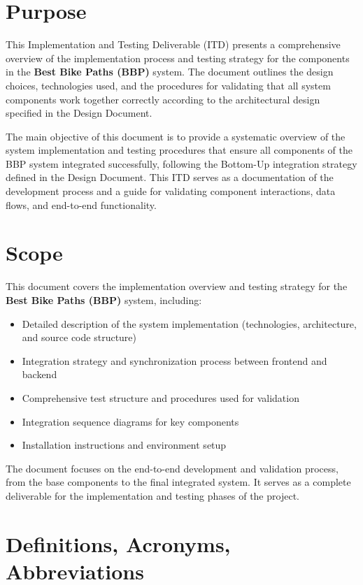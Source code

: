 \section{Purpose}
\label{sec:purpose}%

This Implementation and Testing Deliverable (ITD) presents a comprehensive overview of the implementation process and testing strategy for the components in the \textbf{Best Bike Paths (BBP)} system. The document outlines the design choices, technologies used, and the procedures for validating that all system components work together correctly according to the architectural design specified in the Design Document.

The main objective of this document is to provide a systematic overview of the system implementation and testing procedures that ensure all components of the BBP system integrated successfully, following the Bottom-Up integration strategy defined in the Design Document. This ITD serves as a documentation of the development process and a guide for validating component interactions, data flows, and end-to-end functionality.

\section{Scope}
\label{sec:scope}%

This document covers the implementation overview and testing strategy for the \textbf{Best Bike Paths (BBP)} system, including:

\begin{itemize}
    \item Detailed description of the system implementation (technologies, architecture, and source code structure)
    \item Integration strategy and synchronization process between frontend and backend
    \item Comprehensive test structure and procedures used for validation
    \item Integration sequence diagrams for key components
    \item Installation instructions and environment setup
\end{itemize}

The document focuses on the end-to-end development and validation process, from the base components to the final integrated system. It serves as a complete deliverable for the implementation and testing phases of the project.

\section{Definitions, Acronyms, Abbreviations}
\label{sec:definition_acronyms_abbreviations}%

